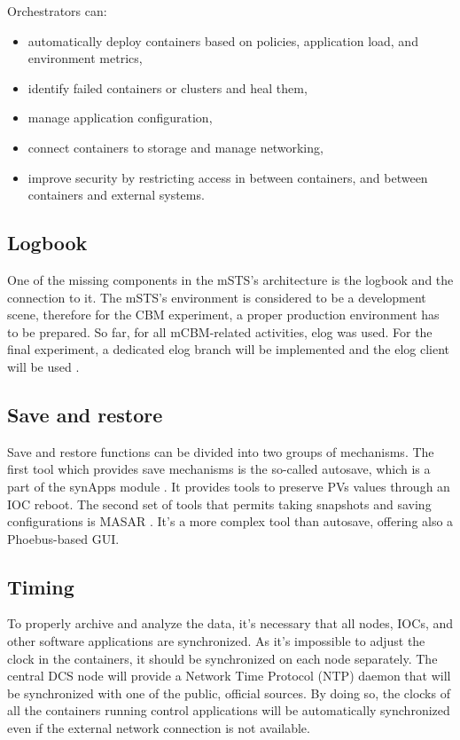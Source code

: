 Orchestrators can:
 \begin{itemize}
     \item automatically deploy containers based on policies, application load, and environment metrics,
     \item identify failed containers or clusters and heal them,
     \item manage application configuration,
     \item connect containers to storage and manage networking,
     \item improve security by restricting access in between containers, and between containers and external systems.
 \end{itemize}
\subsection{Logbook}
One of the missing components in the mSTS's architecture is the logbook and the connection to it. The mSTS's environment is considered to be a development scene, therefore for the CBM experiment, a proper production environment has to be prepared. So far, for all mCBM-related activities, elog \cite{elog} was used. For the final experiment, a dedicated elog branch will be implemented and the elog client will be used \cite{elog_client}.
\subsection{Save and restore}
Save and restore functions can be divided into two groups of mechanisms. The first tool which provides save mechanisms is the so-called autosave, which is a part of the synApps module \cite{autosave}. It provides tools to preserve PVs values through an IOC reboot. The second set of tools that permits taking snapshots and saving configurations is MASAR \cite{masar}. It's a more complex tool than autosave, offering also a Phoebus-based \gls{GUI}. 
\subsection{Timing}
To properly archive and analyze the data, it's necessary that all nodes, \gls{IOC}s, and other software applications are synchronized. As it's impossible to adjust the clock in the containers, it should be synchronized on each node separately. The central \gls{DCS} node will provide a Network Time Protocol (\gls{NTP}) daemon that will be synchronized with one of the public, official sources.  By doing so, the clocks of all the containers running control applications will be automatically synchronized even if the external network connection is not available. 
